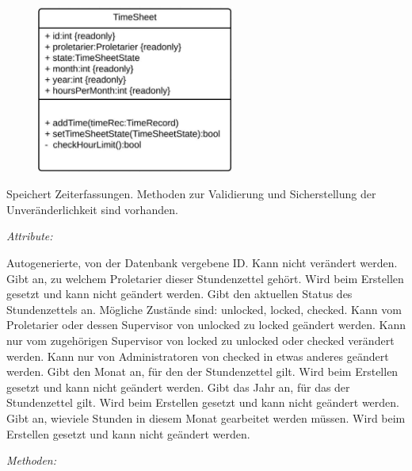 \begin{itemize}
            \newpage
                \begin{figure}[htb]
                \centering
                \includegraphics[width=6.5cm]{Diagramms/class/singleclass/TimeSheet.pdf}
                \end{figure}
                \newline
                Speichert Zeiterfassungen. Methoden zur Validierung und Sicherstellung der Unveränderlichkeit sind vorhanden.
                
                \emph{Attribute:}
                \begin{itemize}
                        Autogenerierte, von der Datenbank vergebene ID.
                        Kann nicht verändert werden.
                        Gibt an, zu welchem Proletarier dieser Stundenzettel gehört.
                        Wird beim Erstellen gesetzt und kann nicht geändert werden.
                        Gibt den aktuellen Status des Stundenzettels an.
                        Mögliche Zustände sind: unlocked, locked, checked.
                        Kann vom Proletarier oder dessen Supervisor von unlocked zu locked geändert werden.
                        Kann nur vom zugehörigen Supervisor von locked zu unlocked oder checked verändert werden.
                        Kann nur von Administratoren von checked in etwas anderes geändert werden.
                        Gibt den Monat an, für den der Stundenzettel gilt.
                        Wird beim Erstellen gesetzt und kann nicht geändert werden.
                        Gibt das Jahr an, für das der Stundenzettel gilt.
                        Wird beim Erstellen gesetzt und kann nicht geändert werden.
                        Gibt an, wieviele Stunden in diesem Monat gearbeitet werden müssen.
                        Wird beim Erstellen gesetzt und kann nicht geändert werden.
                \end{itemize}
                \newpage
                \emph{Methoden:}
                \begin{itemize}
                \end{itemize}


\end{itemize}
